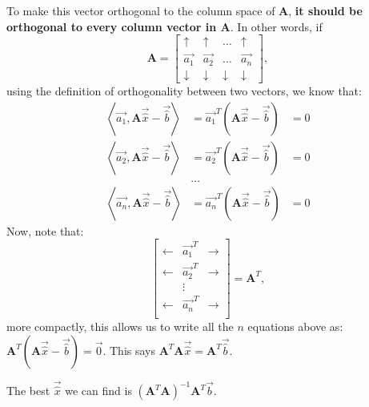 \begin{enumerate}
{To make this vector orthogonal to the column space of $\mathbf{A}$, \textbf{it should be orthogonal to every column vector in $\mathbf{A}$}.
In other words, if $$
\mathbf{A} = 
\begin{bmatrix}
\uparrow & \uparrow & \hdots  & \uparrow \\
\vec{a_1} & \vec{a_2} & \hdots & \vec{a_n} \\
\downarrow & \downarrow & \downarrow & \downarrow
\end{bmatrix},
$$ using the definition of orthogonality between two vectors, we know that:
$$\begin{aligned}
\left \langle \vec{a_1}, \mathbf{A}\vec{\hat{x}} - \vec{\hat{b}} \right \rangle &= \vec{a_1}^T(\mathbf{A}\vec{\hat{x}} - \vec{\hat{b}}) &= 0 \\
\left \langle \vec{a_2}, \mathbf{A}\vec{\hat{x}} - \vec{\hat{b}} \right \rangle &= \vec{a_2}^T(\mathbf{A}\vec{\hat{x}} - \vec{\hat{b}}) &= 0 \\
& \hdots & \\
\left \langle \vec{a_n}, \mathbf{A}\vec{\hat{x}} - \vec{\hat{b}} \right \rangle &= \vec{a_n}^T(\mathbf{A}\vec{\hat{x}} - \vec{\hat{b}}) &= 0
\end{aligned}$$
Now, note that:
$$
\begin{bmatrix}
\leftarrow & \vec{a_1}^T & \rightarrow \\
\leftarrow & \vec{a_2}^T & \rightarrow \\
           & \vdots & \\
\leftarrow & \vec{a_n}^T & \rightarrow \\
\end{bmatrix} = \mathbf{A}^T, 
$$
more compactly, this allows us to write all the $n$ equations above as: $\mathbf{A}^T(\mathbf{A}\vec{\hat{x}} - \vec{\hat{b}}) = \vec{0}$. This says $\mathbf{A}^T\mathbf{A}\vec{\hat{x}} = \mathbf{A}^T\vec{\hat{b}}$.

The best $\vec{\hat{x}}$ we can find is $(\mathbf{A}^T\mathbf{A})^{-1}\mathbf{A}^T\vec{b}$.
}

    
\end{enumerate}